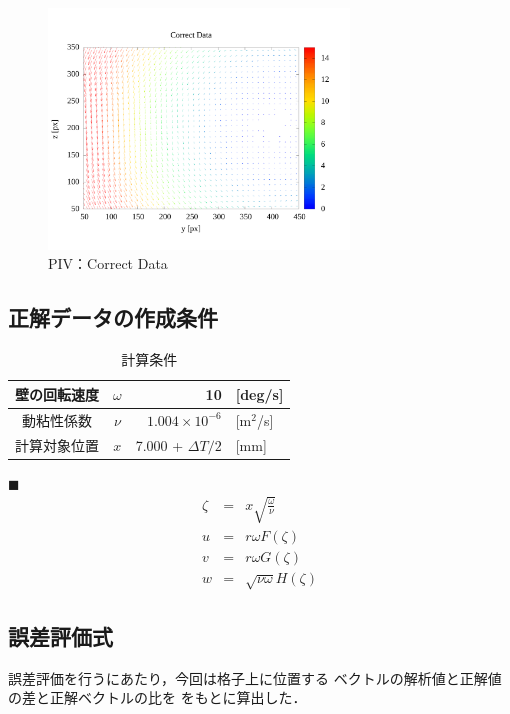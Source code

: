\documentclass[twocolumn,a4j]{jsarticle}
\begin{document}
\begin{figure}[htbp]
  \footnotesize
  \begin{center}
    \includegraphics[width=80mm]{../images/correct.png}
    \caption{PIV：Correct Data}
  \end{center}
\end{figure}

\newpage

\subsection{正解データの作成条件}

\begin{table}[hbtp]
  \label{table:data_type}
  \caption{計算条件}
  \centering
  \begin{tabular}{ c c | r l}
    \hline
    壁の回転速度 & $\omega$ & 10                     & [deg/s]            \\ \hline
    動粘性係数   & $\nu$    & $1.004 \times 10^{-6}$ & [$\mathrm{m}^2$/s] \\ \hline
    計算対象位置 & $x$      & 7.000 + $\Delta T/2$   & [mm]               \\ \hline
  \end{tabular}
\end{table}

\noindent
$\blacksquare$ 
\begin{eqnarray*}
  \zeta &=& x \sqrt{\frac{\omega}{\nu}}\\
  u &=& r \omega F \left(\zeta\right)\\
  v &=& r \omega G \left(\zeta\right)\\
  w &=& \sqrt{\nu \omega} H \left(\zeta\right)
\end{eqnarray*}

\subsection{誤差評価式}
誤差評価を行うにあたり，今回は格子上に位置する
ベクトルの解析値と正解値の差と正解ベクトルの比を
をもとに算出した．
\end{document}
